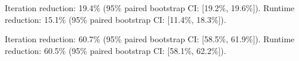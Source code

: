 Iteration reduction: 19.4\% (95\% paired bootstrap CI: [19.2\%, 19.6\%]).
Runtime reduction: 15.1\% (95\% paired bootstrap CI: [11.4\%, 18.3\%]).

Iteration reduction: 60.7\% (95\% paired bootstrap CI: [58.5\%, 61.9\%]).
Runtime reduction: 60.5\% (95\% paired bootstrap CI: [58.1\%, 62.2\%]).
